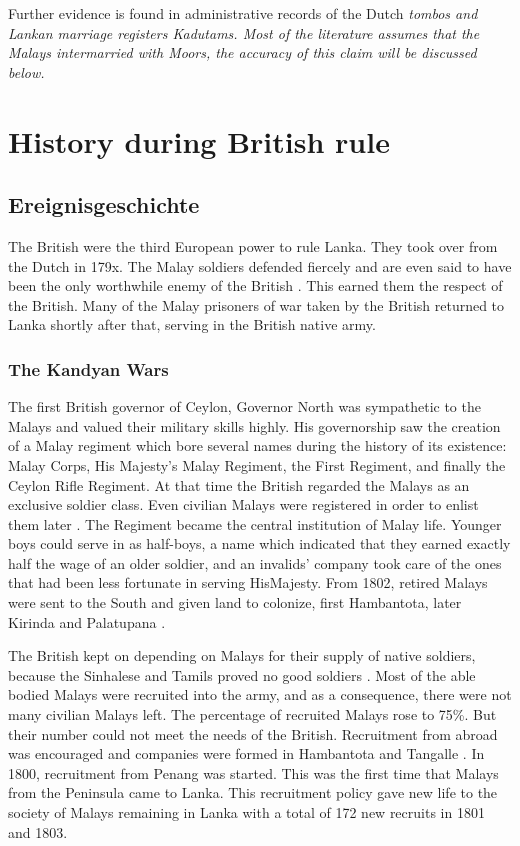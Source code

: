 Further evidence is found in administrative records of the Dutch \em tombos  \em and Lankan marriage registers \em Kadutams. \em Most of the literature assumes that the Malays intermarried with Moors, the accuracy of this claim will be discussed below.

\section{History during British rule}\label{sec:slmbg:HistoryduringBritishrule}
\subsection{Ereignisgeschichte}\label{sec:slmbg:British:Ereignisgeschichte}
The British were the third European power to rule Lanka. They took over from the Dutch in 179x. The Malay soldiers defended fiercely and are even said to have been the only worthwhile enemy of the British \citep[cf.][42,44]{Powell1973}. This earned them the respect of the British. Many of the Malay prisoners of war taken by the British returned to Lanka shortly after that, serving in the British native army.

\subsubsection{The Kandyan Wars}\label{sec:slmbg:TheKandyanWars}
The first British governor of Ceylon, Governor North was sympathetic to the Malays and valued their military skills highly. His governorship saw the creation of a Malay regiment which bore several names during the history of its existence: Malay Corps, His Majesty's Malay Regiment, the First Regiment, and finally the Ceylon Rifle Regiment.
At that time the British regarded the Malays as an exclusive soldier class. Even civilian Malays were registered in order to enlist them later \citep[61]{Hussainmiya1990}.
The Regiment became the central institution of Malay life. Younger boys could serve in as half-boys, a name which indicated that they earned exactly half the wage of an older soldier, and an invalids' company took care of the ones that had been less fortunate in serving His\kuckn Majesty. From 1802, retired Malays were sent to the South and given land to colonize, first Hambantota, later Kirinda and Palatupana \citep[63]{Hussainmiya1990}.

The British kept on depending on Malays for their supply of native soldiers, because the Sinhalese and Tamils proved no good soldiers \citep[24]{Hussainmiya1990}. Most of the able bodied Malays were recruited into the army, and as a consequence, there were not many civilian Malays left. The percentage of recruited Malays rose to 75\%.
But their number could not meet the needs of the British. Recruitment from abroad was encouraged and companies were formed in Hambantota and Tangalle \citep[64f]{Hussainmiya1990}. In 1800, recruitment from Penang was started. This was the first time that Malays from the Peninsula came to Lanka. This recruitment policy gave new life to the society of  Malays remaining  in Lanka \citep[73]{Hussainmiya1990} with a total of 172 new recruits in 1801 and 1803.

